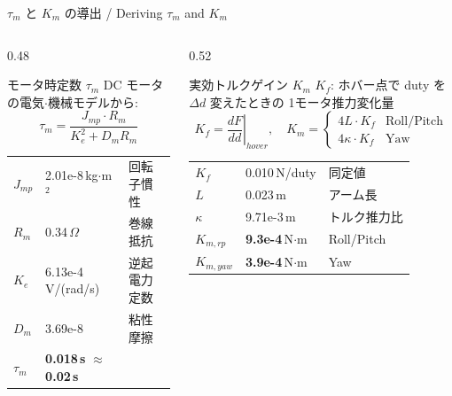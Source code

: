 \documentclass[aspectratio=169, 14pt]{beamer}
\begin{document}
\begin{frame}{$\tau_m$ と $K_m$ の導出 / Deriving $\tau_m$ and $K_m$}
  \vspace{-2mm}
  \begin{columns}[t]
    \begin{column}{0.48\textwidth}
      \begin{block}{モータ時定数 $\tau_m$}\small
        DC モータの電気$\cdot$機械モデルから:
        \vspace{-0.5em}
        \[
          \tau_m = \frac{J_{mp} \cdot R_m}{K_e^2 + D_m R_m}
        \]
        \vspace{-1.5em}
      \end{block}
      \vspace{-0.2em}
      {\scriptsize
      \begin{tabular}{lll}
        \hline
        $J_{mp}$ & 2.01e-8\,kg$\cdot$m$^2$ & 回転子慣性 \\
        $R_m$    & 0.34\,$\Omega$    & 巻線抵抗 \\
        $K_e$    & 6.13e-4\,V/(rad/s) & 逆起電力定数 \\
        $D_m$    & 3.69e-8 & 粘性摩擦 \\
        \hline
        $\tau_m$ & \textbf{0.018\,s} $\approx$ \textbf{0.02\,s} & \\
        \hline
      \end{tabular}}
    \end{column}
    \begin{column}{0.52\textwidth}
      \begin{block}{実効トルクゲイン $K_m$}\small
        $K_f$: ホバー点で duty を $\Delta d$ 変えたときの
        1モータ推力変化量\vspace{-0.3em}
        \[
          K_f = \left.\frac{dF}{dd}\right|_{\!hover}\!,\quad
          K_m = \begin{cases}
            4L \cdot K_f & \text{Roll/Pitch}\\
            4\kappa \cdot K_f & \text{Yaw}
          \end{cases}
        \]
        \vspace{-1.5em}
      \end{block}
      \vspace{-0.2em}
      {\scriptsize
      \begin{tabular}{lll}
        \hline
        $K_f$       & 0.010\,N/duty & 同定値 \\
        $L$         & 0.023\,m & アーム長 \\
        $\kappa$    & 9.71e-3\,m & トルク推力比 \\
        \hline
        $K_{m,rp}$  & \textbf{9.3e-4}\,N$\cdot$m & Roll/Pitch \\
        $K_{m,yaw}$ & \textbf{3.9e-4}\,N$\cdot$m & Yaw \\
        \hline
      \end{tabular}}
    \end{column}
  \end{columns}


\end{frame}
\end{document}
